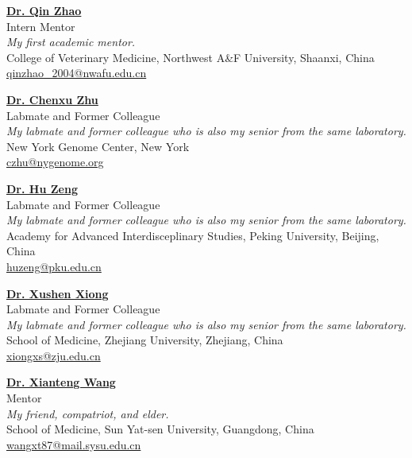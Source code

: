 \vspace{4pt}

\textbf{\href{https://dyxy.nwsuaf.edu.cn/en/People/FullProfessor/5e6012bf013a499c946289472b285795.htm}{Dr. Qin Zhao}}\\
Intern Mentor\\
\textit{My first academic mentor.} \\
College of Veterinary Medicine, Northwest A\&F University, Shaanxi, China\\
\href{mailto:qinzhao\_2004@nwafu.edu.cn}{qinzhao\_2004@nwafu.edu.cn}\\

\vspace{4pt}

\textbf{\href{https://www.nygenome.org/science-technology/faculty-labs/zhu-lab/}{Dr. Chenxu Zhu}}\\
Labmate and Former Colleague\\
\textit{My labmate and former colleague who is also my senior from the same laboratory.} \\
New York Genome Center,  New York\\
\href{mailto:czhu@nygenome.org}{czhu@nygenome.org}\\


\vspace{4pt}

\textbf{\href{http://www.aais.pku.edu.cn/duiwu/showproduct.php?id=318}{Dr. Hu Zeng}}\\
Labmate and Former Colleague\\
\textit{My labmate and former colleague who is also my senior from the same laboratory.} \\
Academy for Advanced Interdisceplinary Studies, Peking University, Beijing, China\\
\href{mailto:huzeng@pku.edu.cn}{huzeng@pku.edu.cn}\\

\vspace{4pt}

\textbf{\href{https://person.zju.edu.cn/xiongxs}{Dr. Xushen Xiong}}\\
Labmate and Former Colleague\\
\textit{My labmate and former colleague who is also my senior from the same laboratory.} \\
School of Medicine,  Zhejiang University, Zhejiang, China\\
\href{mailto:xiongxs@zju.edu.cn}{xiongxs@zju.edu.cn}\\

\vspace{4pt}

\textbf{\href{https://szmed.sysu.edu.cn/zh-hans/teacher/2767}{Dr. Xianteng Wang}}\\
Mentor\\
\textit{My friend, compatriot, and elder.} \\
School of Medicine,  Sun Yat-sen University, Guangdong, China\\
\href{mailto:wangxt87@mail.sysu.edu.cn}{wangxt87@mail.sysu.edu.cn}\\